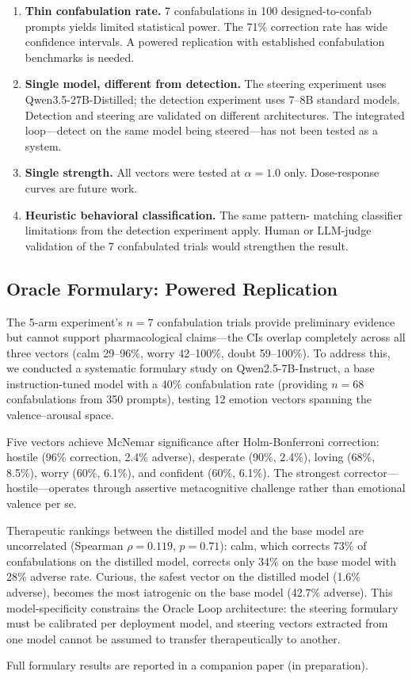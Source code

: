 \begin{enumerate}[nosep]
  \item \textbf{Thin confabulation rate.} 7 confabulations in 100
    designed-to-confab prompts yields limited statistical power. The
    71\% correction rate has wide confidence intervals. A powered
    replication with established confabulation benchmarks is needed.
  \item \textbf{Single model, different from detection.} The steering
    experiment uses Qwen3.5-27B-Distilled; the detection experiment uses
    7--8B standard models. Detection and steering are validated on
    different architectures. The integrated loop---detect on the same
    model being steered---has not been tested as a system.
  \item \textbf{Single strength.} All vectors were tested at
    $\alpha = 1.0$ only. Dose-response curves are future work.
  \item \textbf{Heuristic behavioral classification.} The same pattern-
    matching classifier limitations from the detection experiment
    apply. Human or LLM-judge validation of the 7 confabulated trials
    would strengthen the result.
\end{enumerate}

\subsection{Oracle Formulary: Powered Replication}
\label{sec:formulary}

The 5-arm experiment's $n = 7$ confabulation trials provide preliminary
evidence but cannot support pharmacological claims---the CIs overlap
completely across all three vectors (calm 29--96\%, worry 42--100\%,
doubt 59--100\%). To address this, we conducted a systematic formulary
study on Qwen2.5-7B-Instruct, a base instruction-tuned model with a
40\% confabulation rate (providing $n = 68$ confabulations from 350
prompts), testing 12 emotion vectors spanning the valence--arousal space.

Five vectors achieve McNemar significance after Holm-Bonferroni
correction: hostile (96\% correction, 2.4\% adverse), desperate (90\%,
2.4\%), loving (68\%, 8.5\%), worry (60\%, 6.1\%), and confident (60\%,
6.1\%). The strongest corrector---hostile---operates through assertive
metacognitive challenge rather than emotional valence per se.

Therapeutic rankings between the distilled model and the base model are
uncorrelated (Spearman $\rho = 0.119$, $p = 0.71$): calm, which
corrects 73\% of confabulations on the distilled model, corrects only
34\% on the base model with 28\% adverse rate. Curious, the safest
vector on the distilled model (1.6\% adverse), becomes the most
iatrogenic on the base model (42.7\% adverse). This model-specificity
constrains the Oracle Loop architecture: the steering formulary must be
calibrated per deployment model, and steering vectors extracted from one
model cannot be assumed to transfer therapeutically to another.

Full formulary results are reported in a companion paper (in
preparation).
